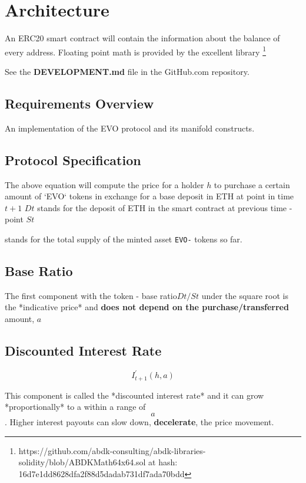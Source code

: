 \section{Architecture}
\label{architecture}

An ERC20 smart contract will contain the information about the balance of every address.
Floating point math is provided by the excellent library \footnote{https://github.com/abdk-consulting/abdk-libraries-solidity/blob/ABDKMath64x64.sol at hash: 16d7e1dd8628dfa2f88d5dadab731df7ada70bdd }

See the \textbf{DEVELOPMENT.md} file in the GitHub.com repository.

\subsection{Requirements Overview}

An implementation of the EVO protocol and its manifold constructs.

\subsection{Protocol Specification}
The above equation will compute the price for a holder $h$ to purchase a certain amount of `EVO` tokens in exchange for a base deposit in ETH at point in time  $t +1$ \neweline $Dt$ stands for the deposit of ETH in the smart contract at previous time - point
\newline$St$
    
stands for the total supply of the minted asset \texttt{EVO-} tokens so far.

\subsection{Base Ratio}
The first component with the token - base ratio\neweline $ Dt/St $ under the square root is the *indicative price* and \textbf{does not depend on the purchase/transferred} amount, $a$

\subsection{Discounted Interest Rate}
\begin{equation}
    I_{t+1}^{\prime}(h, a)
\end{equation}

This component is called the *discounted interest rate* and it can grow *proportionally* to a within a range of 
\begin{equation}
 [0, 0.24] a 
\end{equation}
.
Higher interest payouts can slow down, \textbf{decelerate}, the price movement. 

